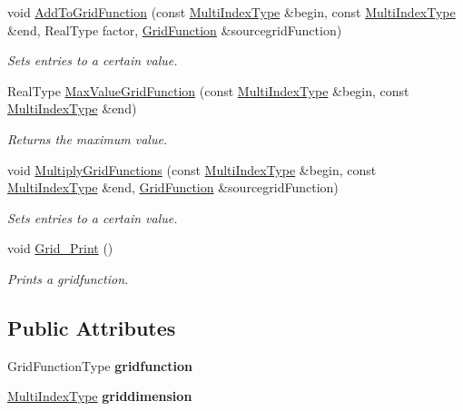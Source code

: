 \begin{DoxyCompactItemize}
void \hyperlink{classGridFunction_a756e723cad5230def9848b32eba10d88}{Add\-To\-Grid\-Function} (const \hyperlink{classArray}{Multi\-Index\-Type} \&begin, const \hyperlink{classArray}{Multi\-Index\-Type} \&end, Real\-Type factor, \hyperlink{classGridFunction}{Grid\-Function} \&sourcegrid\-Function)
\begin{DoxyCompactList}\small\item\em Sets entries to a certain value. \end{DoxyCompactList}\item 
Real\-Type \hyperlink{classGridFunction_a430e498104762b7502bb095db0973aed}{Max\-Value\-Grid\-Function} (const \hyperlink{classArray}{Multi\-Index\-Type} \&begin, const \hyperlink{classArray}{Multi\-Index\-Type} \&end)
\begin{DoxyCompactList}\small\item\em Returns the maximum value. \end{DoxyCompactList}\item 
void \hyperlink{classGridFunction_a2661f54b4e5be6b1cc0420c2ffb63b3b}{Multiply\-Grid\-Functions} (const \hyperlink{classArray}{Multi\-Index\-Type} \&begin, const \hyperlink{classArray}{Multi\-Index\-Type} \&end, \hyperlink{classGridFunction}{Grid\-Function} \&sourcegrid\-Function)
\begin{DoxyCompactList}\small\item\em Sets entries to a certain value. \end{DoxyCompactList}\item 
void \hyperlink{classGridFunction_a438366ad02bfeaf9e4171f74c019a71b}{Grid\-\_\-\-Print} ()
\begin{DoxyCompactList}\small\item\em Prints a gridfunction. \end{DoxyCompactList}\end{DoxyCompactItemize}
\subsection*{Public Attributes}
\begin{DoxyCompactItemize}
\item 
\hypertarget{classGridFunction_a5867918365aab37ead25cd3ebfc846e4}{Grid\-Function\-Type {\bfseries gridfunction}}\label{classGridFunction_a5867918365aab37ead25cd3ebfc846e4}

\item 
\hypertarget{classGridFunction_a4f0b5b147512e4307b0b3fc777d0b200}{\hyperlink{classArray}{Multi\-Index\-Type} {\bfseries griddimension}}\label{classGridFunction_a4f0b5b147512e4307b0b3fc777d0b200}

\end{DoxyCompactItemize}


